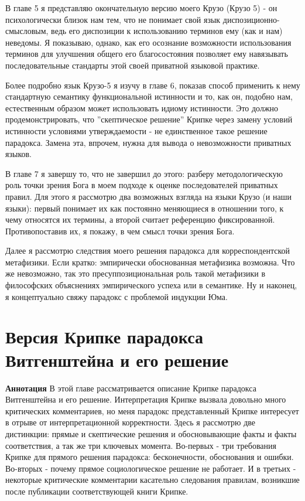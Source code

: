 \documentclass{book}
\begin{document}
В главе 5 я представляю окончательную версию моего Крузо (Крузо 5) - он психологически близок нам тем, что не понимает свой язык диспозиционно-смысловым, ведь его диспозиции к использованию терминов ему (как и нам) неведомы. Я показываю, однако, как его осознание возможности использования терминов для улучшения общего его благосостояния позволяет ему навязывать последовательные стандарты этой своей приватной языковой практике.

Более подробно язык Крузо-5 я изучу в главе 6, показав способ применить к нему стандартную семантику функциональной истинности и то, как он, подобно нам, естественным образом может использовать идиому истинности. Это должно продемонстрировать, что ''скептическое решение'' Крипке через замену условий истинности условиями утверждаемости - не единственное такое решение парадокса. Замена эта, впрочем, нужна для вывода о невозможности приватных языков.

В главе 7 я завершу то, что не завершил до этого: разберу методологическую роль точки зрения Бога в моем подходе к оценке последователей приватных правил. Для этого я рассмотрю два возможных взгляда на языки Крузо (и наши языки): первый понимает их как постоянно меняющиеся в отношении того, к чему относятся их термины, а второй считает референцию фиксированной. Противопоставив их, я покажу, в чем смысл точки зрения Бога.

Далее я рассмотрю следствия моего решения парадокса для корреспондентской метафизики. Если кратко: эмпирически обоснованная метафизика возможна. Что же невозможно, так это пресуппозициональная роль такой метафизики в философских объяснениях эмпирического успеха или в семантике. Ну и наконец, я концептуально свяжу парадокс с проблемой индукции Юма.

\chapter{Версия Крипке парадокса Витгенштейна и его решение}

\textbf{Аннотация} В этой главе рассматривается описание Крипке парадокса Витгенштейна и его решение. Интерпретация Крипке вызвала довольно много критических комментариев, но меня парадокс представленный Крипке интересует в отрыве от интерпретационной корректности. Здесь я рассмотрю две дистинкции: прямые и скептические решения и обосновывающие факты и факты соответствия, а так же три ключевых момента. Во-первых - три требования Крипке для прямого решения парадокса: бесконечности, обоснования и ошибки. Во-вторых - почему прямое социологическое решение не работает. И в третьих - некоторые критические комментарии касательно следования правилам, возникшие после публикации соответствующей книги Крипке.
\end{document}
